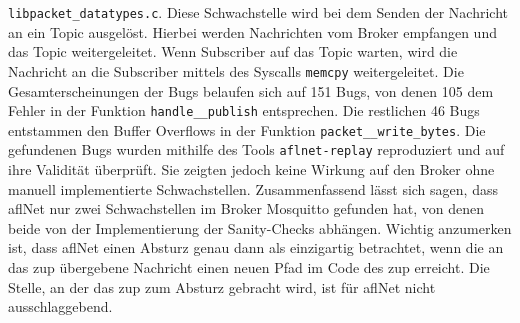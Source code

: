 \texttt{lib\/packet\_datatypes.c}.
Diese Schwachstelle wird bei dem Senden der Nachricht an ein Topic ausgelöst.
Hierbei werden Nachrichten vom Broker empfangen und das Topic weitergeleitet.
Wenn Subscriber auf das Topic warten, wird die Nachricht an die Subscriber mittels des Syscalls \texttt{memcpy} weitergeleitet.
\newline
Die Gesamterscheinungen der Bugs belaufen sich auf 151 Bugs, von denen 105 dem Fehler in der Funktion
\texttt{handle\_\_publish} entsprechen.
Die restlichen 46 Bugs entstammen den Buffer Overflows in der Funktion \texttt{packet\_\_write\_bytes}.
\newline
Die gefundenen Bugs wurden mithilfe des Tools \texttt{aflnet-replay} reproduziert und auf ihre Validität überprüft.
Sie zeigten jedoch keine Wirkung auf den Broker ohne manuell implementierte Schwachstellen.\newline\newline
Zusammenfassend lässt sich sagen, dass \gls{afl}Net nur zwei Schwachstellen im Broker Mosquitto gefunden hat, von denen
beide von der Implementierung der Sanity-Checks abhängen.
Wichtig anzumerken ist, dass \gls{afl}Net einen Absturz genau dann als einzigartig betrachtet, wenn die an das \gls{zup}
übergebene Nachricht einen neuen Pfad im Code des \gls{zup} erreicht.
Die Stelle, an der das \gls{zup} zum Absturz gebracht wird, ist für \gls{afl}Net nicht ausschlaggebend.